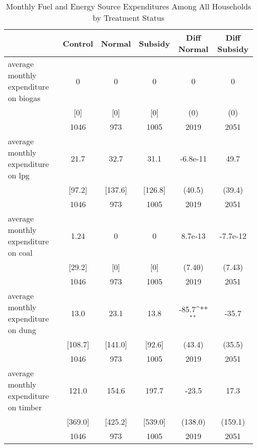 \begin{table}[htbp]\centering
\def\sym#1{\ifmmode^{#1}\else\(^{#1}\)\fi}
\caption{Monthly Fuel and Energy Source Expenditures Among All Households by Treatment Status \label{tab:"balance"}}
\begin{tabular*}{0.9\hsize}{@{\hskip\tabcolsep\extracolsep\fill}l*{1}{ccccc}}
\toprule
                                &  Control&   Normal&  Subsidy&Diff Normal         &Diff Subsidy         \\
\midrule
average monthly expenditure on biogas&        0&        0&        0&        0         &        0         \\
                                &      [0]&      [0]&      [0]&      (0)         &      (0)         \\
                                &     1046&      973&     1005&     2019         &     2051         \\
average monthly expenditure on lpg&     21.7&     32.7&     31.1& -6.8e-11         &     49.7         \\
                                &   [97.2]&  [137.6]&  [126.8]&   (40.5)         &   (39.4)         \\
                                &     1046&      973&     1005&     2019         &     2051         \\
average monthly expenditure on coal&     1.24&        0&        0&  8.7e-13         & -7.7e-12         \\
                                &   [29.2]&      [0]&      [0]&   (7.40)         &   (7.43)         \\
                                &     1046&      973&     1005&     2019         &     2051         \\
average monthly expenditure on dung&     13.0&     23.1&     13.8&    -85.7\sym{**} &    -35.7         \\
                                &  [108.7]&  [141.0]&   [92.6]&   (43.4)         &   (35.5)         \\
                                &     1046&      973&     1005&     2019         &     2051         \\
average monthly expenditure on timber&    121.0&    154.6&    197.7&    -23.5         &     17.3         \\
                                &  [369.0]&  [425.2]&  [539.0]&  (138.0)         &  (159.1)         \\
                                &     1046&      973&     1005&     2019         &     2051         \\

\end{tabular*}
\end{table}

